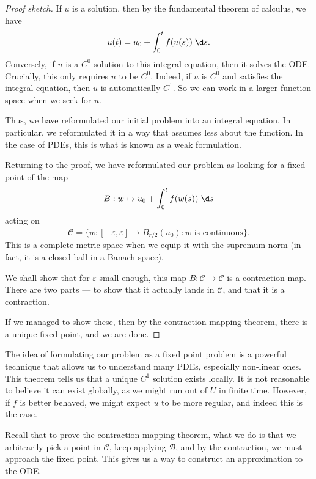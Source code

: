 \documentclass[a4paper]{article}
\begin{document}
\begin{proof}[Proof sketch]
  If $u$ is a solution, then by the fundamental theorem of calculus, we have
  \[
    u(t) = u_0 + \int_0^t f(u(s))\;\d s.
  \]
  Conversely, if $u$ is a $C^0$ solution to this integral equation, then it solves the ODE. Crucially, this only requires $u$ to be $C^0$. Indeed, if $u$ is $C^0$ and satisfies the integral equation, then $u$ is automatically $C^1$. So we can work in a larger function space when we seek for $u$.

  Thus, we have reformulated our initial problem into an integral equation. In particular, we reformulated it in a way that assumes less about the function. In the case of PDEs, this is what is known as a weak formulation.

  Returning to the proof, we have reformulated our problem as looking for a fixed point of the map
  \[
    B: w \mapsto u_0+ \int_0^t f(w(s))\;\d s
  \]
  acting on
  \[
    \mathcal{C} = \{w: [-\varepsilon, \varepsilon] \to \overline{B_{r/2}(u_0)} : w\text{ is continuous}\}.
  \]
  This is a complete metric space when we equip it with the supremum norm (in fact, it is a closed ball in a Banach space).

  We shall show that for $\varepsilon$ small enough, this map $B: \mathcal{C} \to \mathcal{C}$ is a contraction map. There are two parts --- to show that it actually lands in $\mathcal{C}$, and that it is a contraction.

  If we managed to show these, then by the contraction mapping theorem, there is a unique fixed point, and we are done.
\end{proof}

The idea of formulating our problem as a fixed point problem is a powerful technique that allows us to understand many PDEs, especially non-linear ones. This theorem tells us that a unique $C^1$ solution exists locally. It is not reasonable to believe it can exist globally, as we might run out of $U$ in finite time. However, if $f$ is better behaved, we might expect $u$ to be more regular, and indeed this is the case.

Recall that to prove the contraction mapping theorem, what we do is that we arbitrarily pick a point in $\mathcal{C}$, keep applying $\mathcal{B}$, and by the contraction, we must approach the fixed point. This gives us a way to construct an approximation to the ODE.
\end{document}
